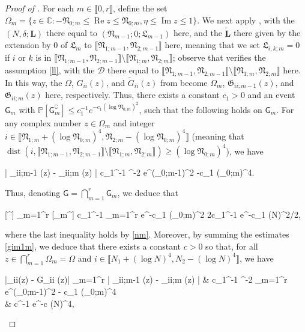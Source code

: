 \documentclass{amsart}
\numberwithin{equation}{section}
\DeclareMathOperator{\Imaginary}{Im}
\DeclareMathOperator{\Real}{Re}
\DeclareMathOperator{\dist}{dist}
\theoremstyle{remark}
\theoremstyle{definition}
\begin{document}
\begin{proof}[Proof of ]
		For each $m \in \llbracket 0, r \rrbracket$, define the set $\Omega_m = \{ z \in \mathbb{C} : -\mathfrak{N}_{0;m} \le \Real z \le \mathfrak{N}_{0;m}, \eta \le \Imaginary z \le 1 \}$. We next apply , with the $(N, \delta; \bm{L})$ there equal to $(\mathfrak{N}_{m-1}; 0; \bm{\mathfrak{L}}_{m-1})$ here, and the $\tilde{\bm{L}}$ there given by the extension by $0$ of $\bm{\mathfrak{L}}_m$ to $\llbracket \mathfrak{N}_{1;m-1}, \mathfrak{N}_{2;m-1} \rrbracket$ here, meaning that we set $\mathfrak{L}_{i,k;m} = 0$ if $i$ or $k$ is in $\llbracket \mathfrak{N}_{1;m-1}, \mathfrak{N}_{2;m-1} \rrbracket \setminus \llbracket \mathfrak{N}_{1;m}, \mathfrak{N}_{2;m} \rrbracket$; observe that  verifies the assumption \eqref{ll}, with the $\mathcal{D}$ there equal to $\llbracket \mathfrak{N}_{1;m-1}, \mathfrak{N}_{2;m-1} \rrbracket \setminus \llbracket \mathfrak{N}_{1;m}, \mathfrak{N}_{2;m} \rrbracket$ here. In this way, the $\Omega$, $G_{ii} (z)$, and $\tilde{G}_{ii}(z)$ from  become $\Omega_m$, $\mathfrak{G}_{ii;m-1} (z)$, and $\mathfrak{G}_{ii;m}(z)$ here, respectively. Thus, there exists a constant $c_1 > 0$ and an event $\mathsf{G}_m$ with $\mathbb{P} [ \mathsf{G}_m^{\complement} ] \le c_1^{-1} e^{-c_1(\log \mathfrak{N}_{0;m})^2}$, such that the following holds on $\mathsf{G}_m$. For any complex number $z \in \Omega_m$ and integer $i \in \llbracket \mathfrak{N}_{1;m} + (\log \mathfrak{N}_{0;m})^4, \mathfrak{N}_{2;m} - (\log \mathfrak{N}_{0;m})^4 \rrbracket$ (meaning that $\dist (i, \llbracket \mathfrak{N}_{1;m-1}, \mathfrak{N}_{2;m-1} \rrbracket \setminus \llbracket \mathfrak{N}_{1;m}, \mathfrak{N}_{2;m} \rrbracket) \ge (\log \mathfrak{N}_{0;m})^4$), we have 
		\begin{flalign}
			\label{gim1m} 
			| _{ii;m-1} (z) - _{ii;m} (z) | \le c_1^{-1} \eta^{-2} \cdot e^{(\log {}_{0;m-1})^2 -c_1 (\log {}_{0;m})^4}. 
		\end{flalign}
		
		 Thus, denoting $\mathsf{G} = \bigcap_{m=1}^r \mathsf{G}_m$, we deduce that 
		\begin{flalign*} 
			 [^{\complement}] \le \displaystyle\sum_{m=1}^r  [_m^{\complement}] \le c_1^{-1} \sum_{m=1}^r e^{-c_1 (\log {}_{0;m})^2} \le 2c_1^{-1} e^{-c_1 (\log N)^2/2},
		\end{flalign*} 
	
		\noindent where the last inequality holds by \eqref{nm}. Moreover, by summing the estimates \eqref{gim1m}, we deduce that there exists a constant $c>0$ so that, for all $z \in \bigcap_{m=1}^r \Omega_m = \Omega$ and $i \in \llbracket N_1 + (\log N)^4, N_2 - (\log N)^4 \rrbracket$, we have 
		\begin{flalign*} 
			|_{ii}(z) - G_{ii} (z)| \le \displaystyle\sum_{m=1}^r | _{ii;m-1} (z) - _{ii;m} (z) \big| & \le  c_1^{-1} \eta^{-2} \displaystyle\sum_{m=1}^r e^{(\log {}_{0;m-1})^2 - c_1 (\log {}_{0;m})^4} \\
			& \le c^{-1} e^{-c (\log N)^4},
		\end{flalign*} 
	

\end{proof}
\end{document}
